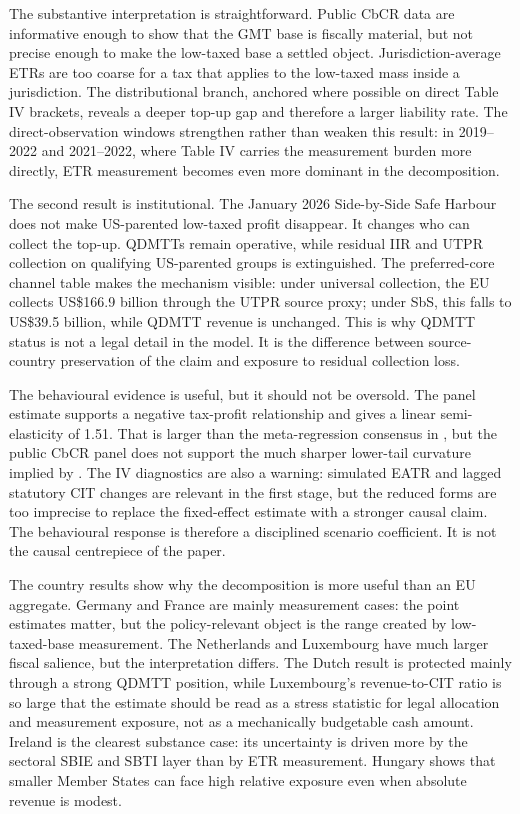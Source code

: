 \documentclass[11pt,a4paper]{article}
\begin{document}
The substantive interpretation is straightforward. Public CbCR data are informative enough to show that the GMT base is fiscally material, but not precise enough to make the low-taxed base a settled object. Jurisdiction-average ETRs are too coarse for a tax that applies to the low-taxed mass inside a jurisdiction. The distributional branch, anchored where possible on direct Table IV brackets, reveals a deeper top-up gap and therefore a larger liability rate. The direct-observation windows strengthen rather than weaken this result: in 2019--2022 and 2021--2022, where Table IV carries the measurement burden more directly, ETR measurement becomes even more dominant in the decomposition.

The second result is institutional. The January 2026 Side-by-Side Safe Harbour does not make US-parented low-taxed profit disappear. It changes who can collect the top-up. QDMTTs remain operative, while residual IIR and UTPR collection on qualifying US-parented groups is extinguished. The preferred-core channel table makes the mechanism visible: under universal collection, the EU collects US\$166.9 billion through the UTPR source proxy; under SbS, this falls to US\$39.5 billion, while QDMTT revenue is unchanged. This is why QDMTT status is not a legal detail in the model. It is the difference between source-country preservation of the claim and exposure to residual collection loss.

The behavioural evidence is useful, but it should not be oversold. The panel estimate supports a negative tax-profit relationship and gives a linear semi-elasticity of 1.51. That is larger than the meta-regression consensus in \citet{heckemeyer2017}, but the public CbCR panel does not support the much sharper lower-tail curvature implied by \citet{dowd2017}. The IV diagnostics are also a warning: simulated EATR and lagged statutory CIT changes are relevant in the first stage, but the reduced forms are too imprecise to replace the fixed-effect estimate with a stronger causal claim. The behavioural response is therefore a disciplined scenario coefficient. It is not the causal centrepiece of the paper.

The country results show why the decomposition is more useful than an EU aggregate. Germany and France are mainly measurement cases: the point estimates matter, but the policy-relevant object is the range created by low-taxed-base measurement. The Netherlands and Luxembourg have much larger fiscal salience, but the interpretation differs. The Dutch result is protected mainly through a strong QDMTT position, while Luxembourg's revenue-to-CIT ratio is so large that the estimate should be read as a stress statistic for legal allocation and measurement exposure, not as a mechanically budgetable cash amount. Ireland is the clearest substance case: its uncertainty is driven more by the sectoral SBIE and SBTI layer than by ETR measurement. Hungary shows that smaller Member States can face high relative exposure even when absolute revenue is modest.
\end{document}

